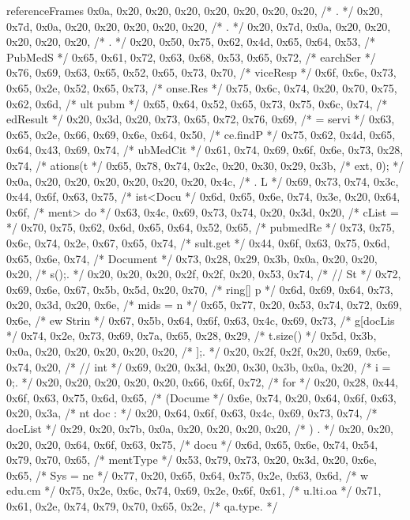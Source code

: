 \begin{chunk}{referenceFrames}
{{{{{{{0x0a, 0x20, 0x20, 0x20, 0x20, 0x20, 0x20, 0x20, /* .        */
0x20, 0x7d, 0x0a, 0x20, 0x20, 0x20, 0x20, 0x20, /*  }.      */
0x20, 0x7d, 0x0a, 0x20, 0x20, 0x20, 0x20, 0x20, /*  }.      */
0x20, 0x50, 0x75, 0x62, 0x4d, 0x65, 0x64, 0x53, /*  PubMedS */
0x65, 0x61, 0x72, 0x63, 0x68, 0x53, 0x65, 0x72, /* earchSer */
0x76, 0x69, 0x63, 0x65, 0x52, 0x65, 0x73, 0x70, /* viceResp */
0x6f, 0x6e, 0x73, 0x65, 0x2e, 0x52, 0x65, 0x73, /* onse.Res */
0x75, 0x6c, 0x74, 0x20, 0x70, 0x75, 0x62, 0x6d, /* ult pubm */
0x65, 0x64, 0x52, 0x65, 0x73, 0x75, 0x6c, 0x74, /* edResult */
0x20, 0x3d, 0x20, 0x73, 0x65, 0x72, 0x76, 0x69, /*  = servi */
0x63, 0x65, 0x2e, 0x66, 0x69, 0x6e, 0x64, 0x50, /* ce.findP */
0x75, 0x62, 0x4d, 0x65, 0x64, 0x43, 0x69, 0x74, /* ubMedCit */
0x61, 0x74, 0x69, 0x6f, 0x6e, 0x73, 0x28, 0x74, /* ations(t */
0x65, 0x78, 0x74, 0x2c, 0x20, 0x30, 0x29, 0x3b, /* ext, 0); */
0x0a, 0x20, 0x20, 0x20, 0x20, 0x20, 0x20, 0x4c, /* .      L */
0x69, 0x73, 0x74, 0x3c, 0x44, 0x6f, 0x63, 0x75, /* ist<Docu */
0x6d, 0x65, 0x6e, 0x74, 0x3e, 0x20, 0x64, 0x6f, /* ment> do */
0x63, 0x4c, 0x69, 0x73, 0x74, 0x20, 0x3d, 0x20, /* cList =  */
0x70, 0x75, 0x62, 0x6d, 0x65, 0x64, 0x52, 0x65, /* pubmedRe */
0x73, 0x75, 0x6c, 0x74, 0x2e, 0x67, 0x65, 0x74, /* sult.get */
0x44, 0x6f, 0x63, 0x75, 0x6d, 0x65, 0x6e, 0x74, /* Document */
0x73, 0x28, 0x29, 0x3b, 0x0a, 0x20, 0x20, 0x20, /* s();.    */
0x20, 0x20, 0x20, 0x2f, 0x2f, 0x20, 0x53, 0x74, /*    // St */
0x72, 0x69, 0x6e, 0x67, 0x5b, 0x5d, 0x20, 0x70, /* ring[] p */
0x6d, 0x69, 0x64, 0x73, 0x20, 0x3d, 0x20, 0x6e, /* mids = n */
0x65, 0x77, 0x20, 0x53, 0x74, 0x72, 0x69, 0x6e, /* ew Strin */
0x67, 0x5b, 0x64, 0x6f, 0x63, 0x4c, 0x69, 0x73, /* g[docLis */
0x74, 0x2e, 0x73, 0x69, 0x7a, 0x65, 0x28, 0x29, /* t.size() */
0x5d, 0x3b, 0x0a, 0x20, 0x20, 0x20, 0x20, 0x20, /* ];.      */
0x20, 0x2f, 0x2f, 0x20, 0x69, 0x6e, 0x74, 0x20, /*  // int  */
0x69, 0x20, 0x3d, 0x20, 0x30, 0x3b, 0x0a, 0x20, /* i = 0;.  */
0x20, 0x20, 0x20, 0x20, 0x20, 0x66, 0x6f, 0x72, /*      for */
0x20, 0x28, 0x44, 0x6f, 0x63, 0x75, 0x6d, 0x65, /*  (Docume */
0x6e, 0x74, 0x20, 0x64, 0x6f, 0x63, 0x20, 0x3a, /* nt doc : */
0x20, 0x64, 0x6f, 0x63, 0x4c, 0x69, 0x73, 0x74, /*  docList */
0x29, 0x20, 0x7b, 0x0a, 0x20, 0x20, 0x20, 0x20, /* ) {.     */
0x20, 0x20, 0x20, 0x20, 0x64, 0x6f, 0x63, 0x75, /*     docu */
0x6d, 0x65, 0x6e, 0x74, 0x54, 0x79, 0x70, 0x65, /* mentType */
0x53, 0x79, 0x73, 0x20, 0x3d, 0x20, 0x6e, 0x65, /* Sys = ne */
0x77, 0x20, 0x65, 0x64, 0x75, 0x2e, 0x63, 0x6d, /* w edu.cm */
0x75, 0x2e, 0x6c, 0x74, 0x69, 0x2e, 0x6f, 0x61, /* u.lti.oa */
0x71, 0x61, 0x2e, 0x74, 0x79, 0x70, 0x65, 0x2e, /* qa.type. */
}}}}}}
\end{chunk}
